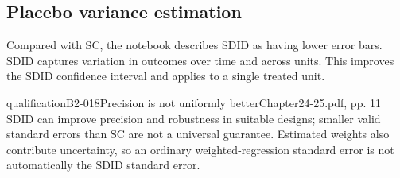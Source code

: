 \subsection{Placebo variance estimation}
Compared with SC, the notebook describes SDID as having lower error bars. SDID captures variation in outcomes over time and across units. This improves the SDID confidence interval and applies to a single treated unit.
\begin{reviewnote}{qualification}{B2-018}{Precision is not uniformly better}{Chapter24-25.pdf, pp. 11}
SDID can improve precision and robustness in suitable designs; smaller valid standard errors than SC are not a universal guarantee. Estimated weights also contribute uncertainty, so an ordinary weighted-regression standard error is not automatically the SDID standard error.
\par{}
\end{reviewnote}


